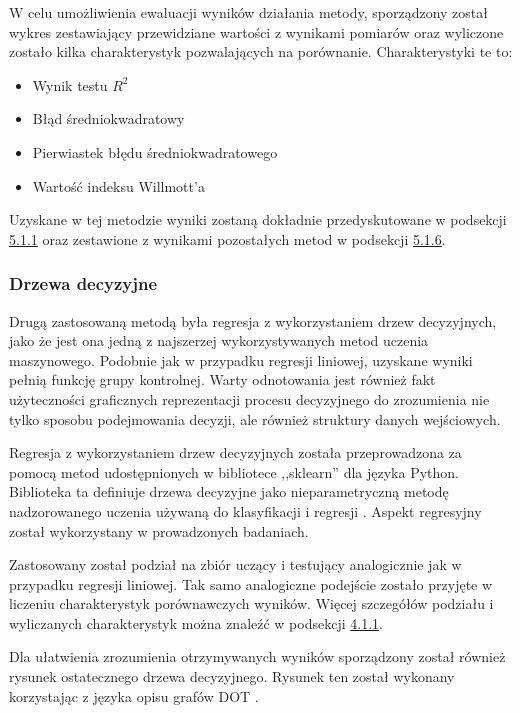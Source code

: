 \documentclass[10pt,a4paper]{article}
\begin{document}
W celu umożliwienia ewaluacji wyników działania metody, sporządzony został wykres zestawiający przewidziane wartości z wynikami pomiarów oraz wyliczone zostało kilka charakterystyk pozwalających na porównanie. Charakterystyki te to:
\begin{center}
	\begin{itemize}
		\item Wynik testu $R^2$
		\item Błąd średniokwadratowy
		\item Pierwiastek błędu średniokwadratowego
		\item Wartość indeksu Willmott'a
	\end{itemize}
\end{center}

Uzyskane w tej metodzie wyniki zostaną dokładnie przedyskutowane w podsekcji \hyperlink{subsubsection.5.1.1}{5.1.1} oraz zestawione z wynikami pozostałych metod w podsekcji \hyperlink{subsubsection.5.1.6}{5.1.6}.

\subsubsection{Drzewa decyzyjne}
Drugą zastosowaną metodą była regresja z wykorzystaniem drzew decyzyjnych, jako że jest ona jedną z najszerzej wykorzystywanych metod uczenia maszynowego. Podobnie jak w przypadku regresji liniowej, uzyskane wyniki pełnią funkcję grupy kontrolnej. Warty odnotowania jest również fakt użyteczności graficznych reprezentacji procesu decyzyjnego do zrozumienia nie tylko sposobu podejmowania decyzji, ale również struktury danych wejściowych. 

Regresja z wykorzystaniem drzew decyzyjnych została przeprowadzona za pomocą metod udostępnionych w bibliotece ,,sklearn'' dla języka Python. Biblioteka ta definiuje drzewa decyzyjne jako nieparametryczną metodę nadzorowanego uczenia używaną do klasyfikacji i regresji \cite{sklearnDecissionTrees}. Aspekt regresyjny został wykorzystany w prowadzonych badaniach. 

Zastosowany został podział na zbiór uczący i testujący analogicznie jak w przypadku regresji liniowej. Tak samo analogiczne podejście zostało przyjęte w liczeniu charakterystyk porównawczych wyników. Więcej szczegółów podziału i wyliczanych charakterystyk można znaleźć w podsekcji \hyperlink{subsubsection.4.1.1}{4.1.1}.

Dla ułatwienia zrozumienia otrzymywanych wyników sporządzony został również rysunek ostatecznego drzewa decyzyjnego. Rysunek ten został wykonany korzystając z języka opisu grafów DOT \cite{dotLanguage}.
\end{document}
